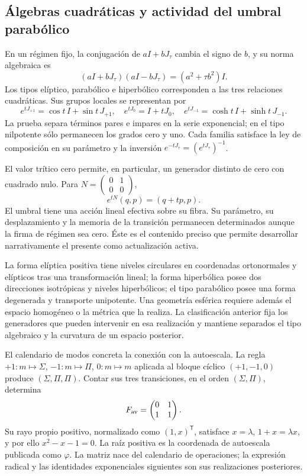 \documentclass[a4paper,10pt]{article}
\theoremstyle{definition}\newtheorem{definition}[theorem]{Definición}
\theoremstyle{remark}\newtheorem{remark}[theorem]{Observación}
\numberwithin{equation}{section}
\begin{document}
\subsection{Álgebras cuadráticas y actividad del umbral parabólico}

En un régimen fijo, la conjugación de \(aI+bJ_\tau\) cambia el signo
de \(b\), y su norma algebraica es
\[
 (aI+bJ_\tau)(aI-bJ_\tau)=(a^2+\tau b^2)I.
\]
Los tipos elíptico, parabólico e hiperbólico corresponden a las tres
relaciones cuadráticas. Sus grupos locales se representan por
\[
 e^{tJ_{+1}}=\cos t\,I+\sin t\,J_{+1},\quad
 e^{tJ_0}=I+tJ_0,\quad
 e^{tJ_{-1}}=\cosh t\,I+\sinh t\,J_{-1}.
\]
La prueba separa términos pares e impares en la serie exponencial; en el
tipo nilpotente sólo permanecen los grados cero y uno. Cada familia
satisface la ley de composición en su parámetro y la inversión
\(e^{-tJ_\tau}=(e^{tJ_\tau})^{-1}\).

El valor trítico cero permite, en particular, un generador distinto de
cero con cuadrado nulo. Para
\(N=\left(\begin{smallmatrix}0&1\\0&0\end{smallmatrix}\right)\),
\[
 e^{tN}(q,p)=(q+tp,p).
\]
El umbral tiene una acción lineal efectiva sobre su fibra. Su parámetro,
su desplazamiento y la memoria de la transición permanecen determinados
aunque la firma de régimen sea cero. Éste es el contenido preciso que
permite desarrollar narrativamente el presente como actualización activa.

La forma elíptica positiva tiene niveles circulares en coordenadas
ortonormales y elípticos tras una transformación lineal; la forma hiperbólica
posee dos direcciones isotrópicas y niveles hiperbólicos; el tipo parabólico
posee una forma degenerada y transporte unipotente. Una geometría esférica
requiere además el espacio homogéneo o la métrica que la realiza. La
clasificación anterior fija los generadores que pueden intervenir en esa
realización y mantiene separados el tipo algebraico y la curvatura de un
espacio posterior.

El calendario de modos concreta la conexión con la autoescala. La regla
\(+1:m\mapsto\Sigma\), \(-1:m\mapsto\Pi\), \(0:m\mapsto m\)
aplicada al bloque cíclico \((+1,-1,0)\) produce
\((\Sigma,\Pi,\Pi)\). Contar sus tres transiciones, en el orden
\((\Sigma,\Pi)\), determina
\begin{equation}
 F_{\rm av}=\begin{pmatrix}0&1\\1&1\end{pmatrix}.
 \label{eq:fav}
\end{equation}
Su rayo propio positivo, normalizado como \((1,x)^\mathsf T\), satisface
\(x=\lambda\), \(1+x=\lambda x\), y por ello
\(x^2-x-1=0\). La raíz positiva es la coordenada de autoescala publicada
como \(\varphi\). La matriz nace del calendario de operaciones; la
expresión radical y las identidades exponenciales siguientes son sus
realizaciones posteriores.
\end{document}

